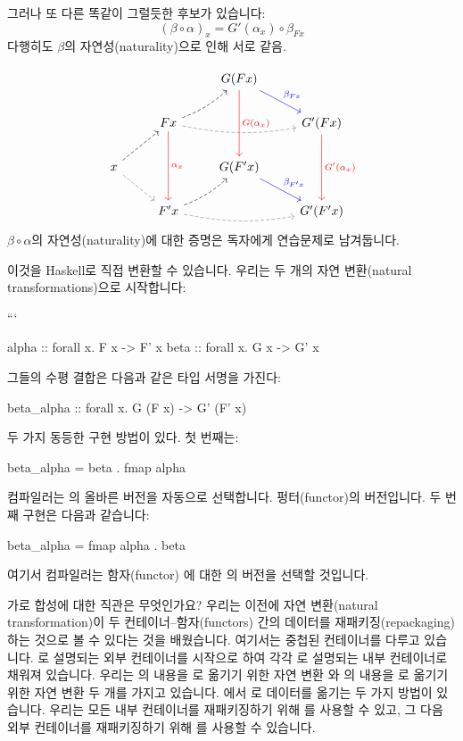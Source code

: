 \documentclass[DaoFP]{subfiles}
\begin{document}
그러나 또 다른 똑같이 그럴듯한 후보가 있습니다:
\[ (\beta \circ \alpha)_x = G'(\alpha_x) \circ \beta_{F x}\]
다행히도 $\beta$의 자연성(naturality)으로 인해 서로 같음.

\[
 \begin{tikzcd}
  && G(F x)
  \arrow[dd, red, "G(\alpha_x)"]
  \arrow[dr, blue, "\beta_{F x}"]
  \\
  & F x
  \arrow[rr, bend right=10, dashed, gray]
  \arrow[ur, bend right=10, dashed]
  \arrow[dd, red, "\alpha_x"]
 && G' (F x)
  \arrow[dd, red, "G'(\alpha_x)"]
 \\
 x
 \arrow[ur, dashed]
 \arrow[dr, gray, dashed]
 && G(F' x)
  \arrow[dr, blue, "\beta_{F' x}"]
 \\
 &F' x
  \arrow[rr, bend right=10, dashed, gray]
 \arrow[ur, bend right=10, dashed]
 && G'(F' x)
\end{tikzcd}
\]
$\beta \circ \alpha$의 자연성(naturality)에 대한 증명은 독자에게 연습문제로 남겨둡니다.

이것을 Haskell로 직접 변환할 수 있습니다. 우리는 두 개의 자연 변환(natural transformations)으로 시작합니다:

```
\begin{haskell}
alpha :: forall x. F x -> F' x
beta  :: forall x. G x -> G' x
\end{haskell}
그들의 수평 결합은 다음과 같은 타입 서명을 가진다:
\begin{haskell}
beta_alpha :: forall x. G (F x) -> G' (F' x)
\end{haskell}
두 가지 동등한 구현 방법이 있다. 첫 번째는:
\begin{haskell}
beta_alpha = beta . fmap alpha
\end{haskell}
컴파일러는 의 올바른 버전을 자동으로 선택합니다.  펑터(functor)의 버전입니다. 두 번째 구현은 다음과 같습니다:
\begin{haskell}
beta_alpha = fmap alpha . beta
\end{haskell}
여기서 컴파일러는 함자(functor) 에 대한 의 버전을 선택할 것입니다.

가로 합성에 대한 직관은 무엇인가요? 우리는 이전에 자연 변환(natural transformation)이 두 컨테이너--함자(functors) 간의 데이터를 재패키징(repackaging)하는 것으로 볼 수 있다는 것을 배웠습니다. 여기서는 중첩된 컨테이너를 다루고 있습니다. 로 설명되는 외부 컨테이너를 시작으로 하여 각각 로 설명되는 내부 컨테이너로 채워져 있습니다. 우리는 의 내용을 로 옮기기 위한 자연 변환 와 의 내용을 로 옮기기 위한 자연 변환  두 개를 가지고 있습니다. 에서 로 데이터를 옮기는 두 가지 방법이 있습니다. 우리는 모든 내부 컨테이너를 재패키징하기 위해 를 사용할 수 있고, 그 다음 외부 컨테이너를 재패키징하기 위해 를 사용할 수 있습니다.
\end{document}
